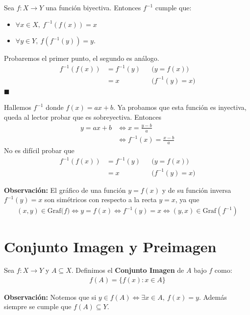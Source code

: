 \documentclass[12pt]{book}
\renewenvironment{proof}[1][\textit{Demostración}]{%
  \par\noindent{\bfseries #1.}\enspace}{\hfill$\blacksquare$\par}
\begin{document}
\begin{prop}{}{}
    Sea $f : X \longrightarrow Y$ una función biyectiva. Entonces $f^{-1}$ cumple que:
    \begin{itemize}
        \item $\forall x \in X, \ f^{-1}(f(x))=x$ 
        \item $\forall y \in Y, \ f(f^{-1}(y))=y$.
    \end{itemize}
\end{prop}
\begin{proof}
    Probaremos el primer punto, el segundo es análogo.
    \begin{align*}
        f^{-1}(f(x))&= f^{-1}(y) && \textbf{($y=f(x)$)} \\
        &=x && \textbf{($f^{-1}(y)=x$)}
    \end{align*}
\end{proof}

\begin{eje}{}{}
    Hallemos $f^{-1}$ donde $f(x)=ax +b$. Ya probamos que esta función es inyectiva, queda al lector probar que es sobreyectiva. Entonces
\begin{align*}
    y=ax+b &\Longleftrightarrow x = \frac{y-b}{a} \\
    &\Longleftrightarrow f^{-1}(x)= \frac{x-b}{a}
\end{align*}
No es difícil probar que 
 \begin{align*}
        f^{-1}(f(x))&= f^{-1}(y) && \textbf{($y=f(x)$)} \\
        &=x && \textbf{($f^{-1}(y)=x$)}
    \end{align*}
\end{eje}

\textbf{Observación:} El gráfico de una función $y=f(x)$ y de su función inversa $f^{-1}(y)=x$ son simétricos con respecto a la recta $y=x$, ya que
\begin{align*}
    (x,y)\in \text{Graf($f$)} \Longleftrightarrow y=f(x) \Longleftrightarrow f^{-1}(y)=x \Longleftrightarrow (y,x) \in \text{Graf}(f^{-1})
\end{align*}

\section{Conjunto Imagen y Preimagen}
\begin{defi}{}{}
    Sea $f : X \longrightarrow Y$ y $A\subseteq X$. Definimos el \textbf{Conjunto Imagen} de $A$ bajo $f$ como:
\begin{align*}
    f(A)= \{ f(x) : x \in A \}
\end{align*}
\end{defi}
\textbf{Observación:} Notemos que si $y \in f(A) \Longleftrightarrow \exists x \in A, \ f(x)=y$. Además siempre se cumple que $f(A) \subseteq Y$.
\end{document}
